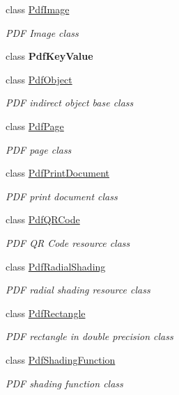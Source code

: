 \begin{DoxyCompactItemize}
\item 
class \hyperlink{class_pdf_file_writer_1_1_pdf_image}{Pdf\+Image}
\begin{DoxyCompactList}\small\item\em P\+DF Image class \end{DoxyCompactList}\item 
class {\bfseries Pdf\+Key\+Value}
\item 
class \hyperlink{class_pdf_file_writer_1_1_pdf_object}{Pdf\+Object}
\begin{DoxyCompactList}\small\item\em P\+DF indirect object base class \end{DoxyCompactList}\item 
class \hyperlink{class_pdf_file_writer_1_1_pdf_page}{Pdf\+Page}
\begin{DoxyCompactList}\small\item\em P\+DF page class \end{DoxyCompactList}\item 
class \hyperlink{class_pdf_file_writer_1_1_pdf_print_document}{Pdf\+Print\+Document}
\begin{DoxyCompactList}\small\item\em P\+DF print document class \end{DoxyCompactList}\item 
class \hyperlink{class_pdf_file_writer_1_1_pdf_q_r_code}{Pdf\+Q\+R\+Code}
\begin{DoxyCompactList}\small\item\em P\+DF QR Code resource class \end{DoxyCompactList}\item 
class \hyperlink{class_pdf_file_writer_1_1_pdf_radial_shading}{Pdf\+Radial\+Shading}
\begin{DoxyCompactList}\small\item\em P\+DF radial shading resource class \end{DoxyCompactList}\item 
class \hyperlink{class_pdf_file_writer_1_1_pdf_rectangle}{Pdf\+Rectangle}
\begin{DoxyCompactList}\small\item\em P\+DF rectangle in double precision class \end{DoxyCompactList}\item 
class \hyperlink{class_pdf_file_writer_1_1_pdf_shading_function}{Pdf\+Shading\+Function}
\begin{DoxyCompactList}\small\item\em P\+DF shading function class \end{DoxyCompactList}\item 

\end{DoxyCompactItemize}
